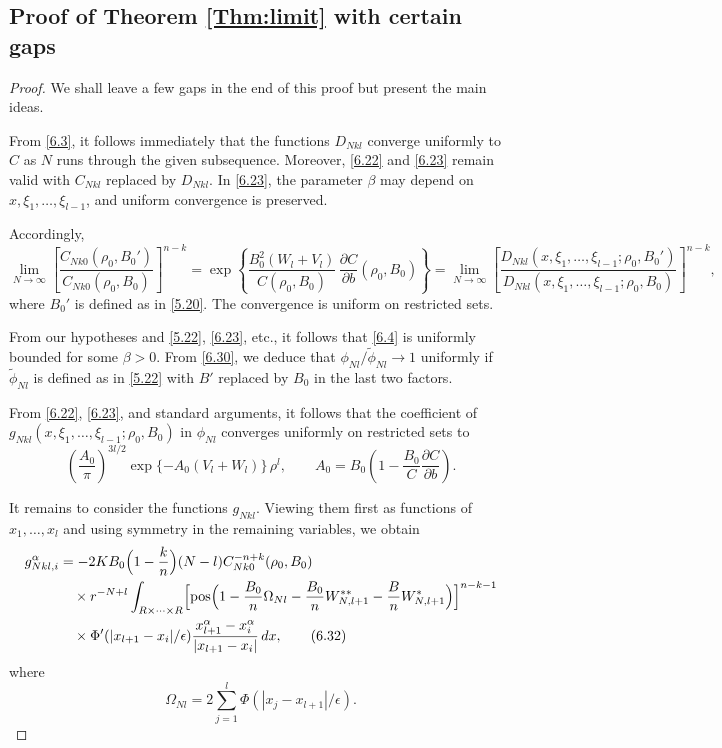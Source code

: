 \documentclass[11pt]{article}
\begin{document}
\subsection{Proof of Theorem \ref{Thm:limit} with certain gaps}
\begin{proof}
We shall leave a few gaps in the end of this proof but present the main ideas.

From \eqref{6.3}, it follows immediately that the functions $D_{Nkl}$
converge uniformly to $C$ as $N$ runs through the given subsequence.
Moreover, \eqref{6.22} and \eqref{6.23} remain valid with $C_{Nkl}$
replaced by $D_{Nkl}$. In \eqref{6.23}, the parameter $\beta$ may depend
on $x,\xi_1,\dots,\xi_{l-1}$, and uniform convergence is preserved.

Accordingly,
\begin{equation}
\lim_{N\to\infty}
\left[
\frac{C_{Nk0}(\rho_0,B_0')}{C_{Nk0}(\rho_0,B_0)}
\right]^{n-k}
=
\exp\!\left\{
\frac{B_0^2 (W_l + V_l)}{C(\rho_0,B_0)}\,\frac{\partial C}{\partial b}(\rho_0,B_0)
\right\}
=
\lim_{N\to\infty}
\left[
\frac{D_{Nkl}(x,\xi_1,\dots,\xi_{l-1};\rho_0,B_0')}
{D_{Nkl}(x,\xi_1,\dots,\xi_{l-1};\rho_0,B_0)}
\right]^{n-k},
\tag{6.30}\label{6.30}
\end{equation}
where $B_0'$ is defined as in \eqref{5.20}. The convergence is uniform on
restricted sets.

From our hypotheses and \eqref{5.22}, \eqref{6.23}, etc., it follows that
\eqref{6.4} is uniformly bounded for some $\beta>0$. From \eqref{6.30},
we deduce that $\phi_{Nl}/\tilde{\phi}_{Nl} \to 1$ uniformly if
$\tilde{\phi}_{Nl}$ is defined as in \eqref{5.22} with $B'$ replaced by $B_0$
in the last two factors.

From \eqref{6.22}, \eqref{6.23}, and standard arguments, it follows that
the coefficient of
$g_{Nkl}(x,\xi_1,\dots,\xi_{l-1};\rho_0,B_0)$ in $\phi_{Nl}$ converges
uniformly on restricted sets to
\begin{equation}
\left(\frac{A_0}{\pi}\right)^{3l/2}
\exp\{-A_0(V_l + W_l)\}\,\rho^l,
\qquad
A_0 = B_0\left(1 - \frac{B_0}{C}\frac{\partial C}{\partial b}\right).
\tag{6.31}\label{6.31}
\end{equation}

It remains to consider the functions $g_{Nkl}$. Viewing them first as
functions of $x_1,\dots,x_l$ and using symmetry in the remaining variables,
we obtain
\begin{align}
g_{Nkl,i}^{\alpha}
&=
-2K B_0\Bigl(1-\frac{k}{n}\Bigr)(N-l)
C_{Nk0}^{-n+k}(\rho_0,B_0)
\nonumber\\
&\quad\times r^{-N+l}
\int_{R\times\cdots\times R}
\Bigl[
\operatorname{pos}\Bigl(
1-\frac{B_0}{n}\Omega_{Nl}
-\frac{B_0}{n}W^{**}_{N,l+1}
-\frac{B}{n}W^{*}_{N,l+1}
\Bigr)
\Bigr]^{n-k-1}
\nonumber\\
&\quad\times
\Phi'(|x_{l+1}-x_i|/\epsilon)
\frac{x_{l+1}^{\alpha}-x_i^{\alpha}}{|x_{l+1}-x_i|}
\,dx,
\tag{6.32}\label{6.32}
\end{align}
where
\[
\Omega_{Nl}
=
2 \sum_{j=1}^l \Phi(|x_j - x_{l+1}|/\epsilon).
\]


\end{proof}
\end{document}
